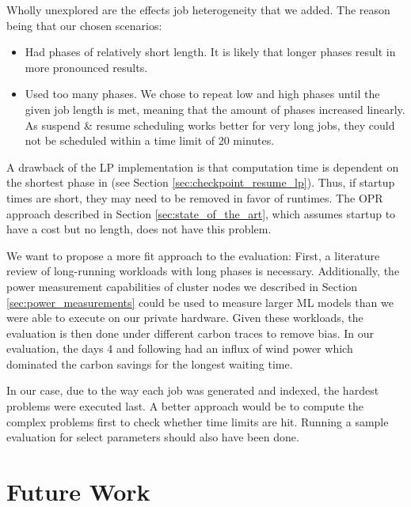 Wholly unexplored are the effects job heterogeneity that we added.
The reason being that our chosen scenarios:

\begin{itemize}
    \item Had phases of relatively short length. It is likely that longer phases result in more pronounced results.
    \item Used too many phases. We chose to repeat low and high phases until the given job length is met, meaning that the amount of phases increased linearly. As suspend \& resume scheduling works better for very long jobs, they could not be scheduled within a time limit of 20 minutes.
\end{itemize}

A drawback of the LP implementation is that computation time is dependent on the shortest phase in \modelname{} (see Section \ref{sec:checkpoint_resume_lp}). Thus, if startup times are short, they may need to be removed in favor of runtimes. The OPR approach described in Section \ref{sec:state_of_the_art}, which assumes startup to have a cost but no length, does not have this problem.

We want to propose a more fit approach to the evaluation:
First, a literature review of long-running workloads with long phases is necessary. Additionally, the power measurement capabilities of cluster nodes we described in Section \ref{sec:power_measurements} could be used to measure larger ML models than we were able to execute on our private hardware.
Given these workloads, the evaluation is then done under different carbon traces to remove bias.
In our evaluation, the days 4 and following had an influx of wind power which dominated the carbon savings for the longest waiting time. 

In our case, due to the way each job was generated and indexed, the hardest problems were executed last. 
A better approach would be to compute the complex problems first to check whether time limits are hit.
Running a sample evaluation for select parameters should also have been done.

\section{Future Work} \label{sec:future_work}


